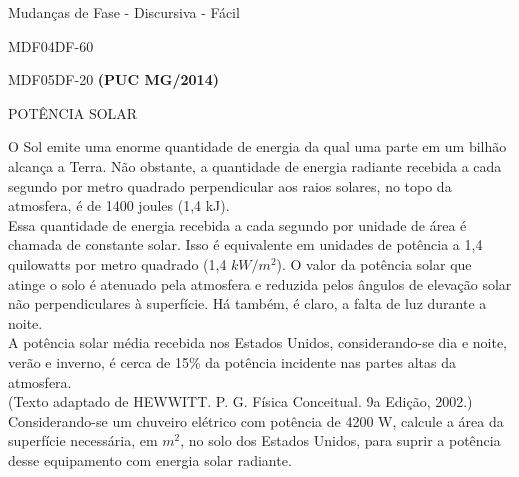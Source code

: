 \documentclass[12pt]{article}
\begin{document}
\begin{quiz}{Mudanças de Fase - Discursiva - Fácil}
\begin{essay}[points=2,penalty=0,response format=file,attachments allowed=1,attachments required=1]{MDF04DF-60}
\begin{center}
			\end{center}					
		\end{essay}
		\begin{essay}[points=2,penalty=0,response format=file,attachments allowed=1,attachments required=1]{MDF05DF-20}
			\textbf{(PUC MG/2014)}
			\begin{center}
			POTÊNCIA SOLAR
			\end{center}			
			O Sol emite uma enorme quantidade de energia da qual uma parte em um bilhão alcança a Terra. Não obstante, a quantidade de energia radiante recebida a cada segundo por metro quadrado perpendicular aos raios solares, no topo da atmosfera, é de 1400 joules (1,4 kJ).\\
			Essa quantidade de energia recebida a cada segundo por unidade de área é chamada de constante solar. Isso é equivalente em unidades de potência a 1,4 quilowatts por metro quadrado (1,4 $kW/m^{2}$). O valor da potência solar que atinge o solo é atenuado pela atmosfera e reduzida pelos ângulos de elevação solar não perpendiculares à superfície. Há também, é claro, a falta de luz durante a noite.\\
			A potência solar média recebida nos Estados Unidos, considerando-se dia e noite, verão e inverno, é cerca de 15\% da potência incidente nas partes altas da atmosfera.\\
			(Texto adaptado de HEWWITT. P. G. Física Conceitual. 9a Edição, 2002.)\\			
			Considerando-se um chuveiro elétrico com potência de 4200 W, calcule a área da superfície necessária, em $m^{2}$, no solo dos Estados Unidos, para suprir a potência desse equipamento com energia solar radiante.								
		\end{essay}										
	\end{quiz}
\end{document}
